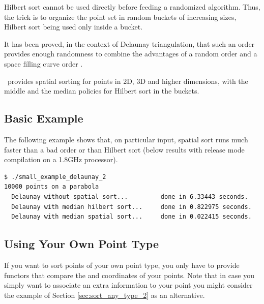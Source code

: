 Hilbert sort cannot be used directly before feeding a randomized algorithm.
Thus, the trick is to organize the point set in random buckets of increasing
sizes, Hilbert sort being used only inside a bucket.

It has been proved, in the context of Delaunay triangulation, that
such an order provides enough randomness to combine the advantages of a random
 order and a space filling curve order \cite{acr-icb-03}.


\cgal\ provides spatial sorting for points in 2D, 3D and higher dimensions,
with the middle and the median policies for Hilbert sort in the buckets.

\subsection{Basic Example}

The following example shows that, on particular input, spatial sort
runs much faster than a bad order or than Hilbert sort (below results
with release mode compilation on a 1.8GHz processor).
\begin{verbatim}
$ ./small_example_delaunay_2 
10000 points on a parabola
  Delaunay without spatial sort...         done in 6.33443 seconds.
  Delaunay with median hilbert sort...     done in 0.822975 seconds.
  Delaunay with median spatial sort...     done in 0.022415 seconds.
\end{verbatim}



\subsection{Using Your Own Point Type}
If you want to sort points of your own point type,
you only have to provide functors that compare
the  and  coordinates of your points. Note that in case you simply want
to associate an extra information to your point you might consider the example of Section
\ref{sec:sort_any_type_2}
as an alternative.


